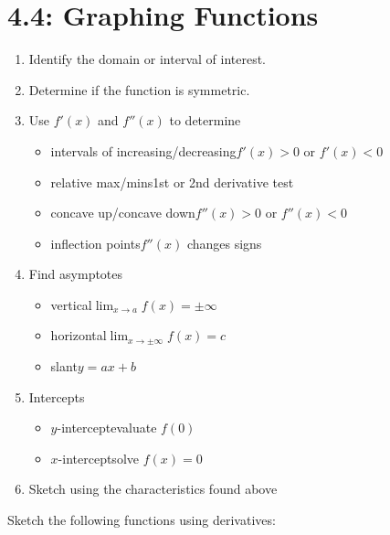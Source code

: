 \documentclass[../mathNotesPreamble]{subfiles}
\begin{document}
\section{4.4: Graphing Functions}
\begin{thmBox*}[Graphing Guidelines for $y=f(x)$]
  \parbox{0.9\linewidth}{
  \begin{enumerate}
    \item Identify the domain or interval of interest.
    \item Determine if the function is symmetric.
    \item Use $f'(x)$ and $f''(x)$ to determine 
      \begin{itemize}
        \item intervals of increasing/decreasing\dotfill $f'(x)>0$ or $f'(x)<0$
        \item relative max/mins\dotfill 1st or 2nd derivative test
        \item concave up/concave down\dotfill $f''(x)>0$ or $f''(x)<0$
        \item inflection points\dotfill $f''(x)$ changes signs
      \end{itemize}
    \item Find asymptotes
      \begin{itemize}
        \item vertical\dotfill $\lim_{x\to a} f(x)=\pm\infty$
        \item horizontal\dotfill $\lim_{x\to \pm\infty} f(x)=c$
        \item slant\dotfill $y=ax+b$
      \end{itemize}
    \item Intercepts
      \begin{itemize}
        \item $y$-intercept\dotfill evaluate $f(0)$
        \item $x$-intercept\dotfill solve $f(x)=0$
      \end{itemize}
    \item Sketch using the characteristics found above
  \end{enumerate}}
\end{thmBox*}
\pagebreak
\begin{ex*}
  Sketch the following functions using derivatives:
\end{ex*}
\end{document}
